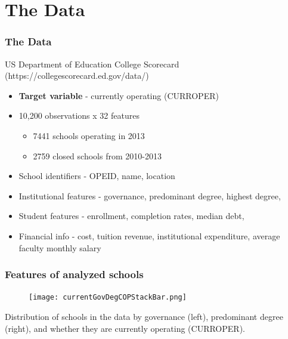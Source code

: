 \documentclass{beamer}
\begin{document}
\section{The Data} %

\begin{frame}
\frametitle{The Data}
US Department of Education College Scorecard \tiny{(https://collegescorecard.ed.gov/data/)}
\normalsize
\begin{itemize}
\item \textbf{Target variable} - currently operating (CURROPER)
\item 10,200 observations  x 32 features
\begin{itemize}
\item 7441 schools operating in 2013
\item 2759 closed schools from 2010-2013
\end{itemize}

\item School identifiers - OPEID, name, location
\item Institutional features - governance, predominant degree, highest degree, 
\item Student features - enrollment, completion rates, median debt,
\item Financial info - cost, tuition revenue, institutional expenditure, average faculty monthly salary
\end{itemize}

\end{frame}

\begin{frame} 
\frametitle{Features of analyzed schools}
\begin{center}

\begin{figure}
\texttt{[image: currentGovDegCOPStackBar.png]}
\end{figure}

Distribution of schools in the data by governance (left), predominant degree (right), and whether they are currently operating (CURROPER).
\end{center}

\end{frame}
\end{document}
